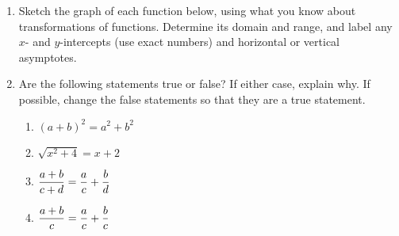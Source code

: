 \documentclass[11pt,fleqn]{article}
\begin{document}
\begin{enumerate}
\item Sketch the graph of each function below, using what you know about transformations of functions. Determine its domain and range, and label any $x$- and $y$-intercepts (use exact numbers) and horizontal or vertical asymptotes.
\begin{enumerate}
\end{enumerate}
\vfill
%
%
%
%
%
%

\item Are the following statements true or false? If
either case, explain why.  If possible, change the false statements so
that they are a true statement. 


  \begin{enumerate}[label=\alph*.]
  \item $(a+b)^2 = a^2 + b^2$ \vskip0.25in
  \item $\sqrt{x^2 + 4} = x + 2$ \vskip0.25in
  \item $\displaystyle \frac{a+b}{c+d} = \frac a c + \frac b d$ \vskip0.25in
  \item $\displaystyle \frac{a+b}{c} = \frac a c + \frac b c$ \vskip0.25in
  \end{enumerate}


\end{enumerate}
\end{document}
